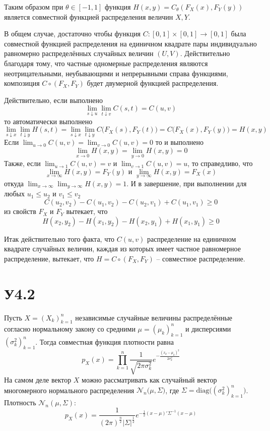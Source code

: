 \documentclass[a4paper]{article}
\newcommand{\Ncal}{\mathcal{N}}
\begin{document}
Таким образом при $\theta\in [-1,1]$ функция $H(x,y)=C_\theta(F_X(x),F_Y(y))$
является совместной функцией распределения величин $X,Y$.

В общем случае, достаточно чтобы функция $C:[0,1]\times[0,1]\to[0,1]$ была
совместной функцией распределения на единичном квадрате пары индивидуально
равномерно распределённых случайных величин $(U,V)$. Действительно благодаря
тому, что частные одномерные распределения являются неотрицательными, неубывающими
и непрерывными справа функциями, композиция $C\circ(F_X,F_Y)$ будет двумерной
функцией распределения.

Действительно, если выполнено
\[\lim_{s\downarrow u}\lim_{t\downarrow v} C(s,t) = C(u,v)\]
то автоматически выполнено
\[
\lim_{s\downarrow x}\lim_{t\downarrow y} H(s,t)
= \lim_{s\downarrow x}\lim_{t\downarrow y} C\bigl(F_X(s),F_Y(t)\bigr)
= C\bigl(F_X(x),F_Y(y)\bigr)
= H(x,y)
\]
Если $\lim_{u\to0} C(u,v) = \lim_{v\to0} C(u,v) = 0$ то и выполнено 
\[\lim_{x\to0} H(x,y) = \lim_{y\to0} H(x,y) = 0\]
Также, если $\lim_{u\to1} C(u,v) = v$ и $\lim_{v\to1} C(u,v) = u$, то справедливо,
что
\[\lim_{x\to\infty}H(x,y) = F_Y(y)\text{ и }\lim_{y\to\infty}H(x,y) = F_X(x)\]
откуда $\lim_{x\to\infty}\lim_{y\to\infty}H(x,y) = 1$.
И в завершение, при выполнении для любых $u_1\leq u_2$ и $v_1\leq v_2$
\[C(u_2,v_2) - C(u_1,v_2) - C(u_2,v_1) + C(u_1,v_1)\geq 0\]
из свойств $F_X$ и $F_Y$ вытекает, что
\[H(x_2,y_2) - H(x_1,y_2) - H(x_2,y_1) + H(x_1,y_1)\geq 0\]

Итак действительно того факта, что $C(u,v)$ распределение на единичном квадрате
случайных величин, каждая из которых имеет частное равномерное распределение,
вытекает, что $H=C\circ(F_X,F_Y)$ -- совместное распределение.



\section{У4.2} %
\label{sec:problem_4_2}

Пусть $X=(X_k)_{k=1}^n$ независимые случайные величины распределённые согласно
нормальному закону со средними $\mu = (\mu_k)_{k=1}^n$ и дисперсиями $(\sigma^2_k)_{k=1}^n$.
Тогда совместная функция плотности равна
\[p_X(x) = \prod_{k=1}^n \frac{1}{\sqrt{2\pi \sigma_k^2}} e^{-\frac{(x_k-\mu_k)^2}{2\sigma^2_k}}\]
На самом деле вектор $X$ можно рассматривать как случайный вектор многомерного
нормального распределения $\Ncal_n\bigl(\mu,\Sigma\bigr)$, где
$\Sigma = \text{diag}\bigl((\sigma^2_k)_{k=1}^n\bigr)$.
Плотность $\Ncal_n(\mu,\Sigma)$:
\[
p_X(x)
= \frac{1}{(2\pi)^\frac{n}{2} \lvert \Sigma \rvert^\frac{1}{2}}
	e^{-\frac{1}{2}(x-\mu)'\Sigma^{-1}(x-\mu)}
\]
\end{document}
